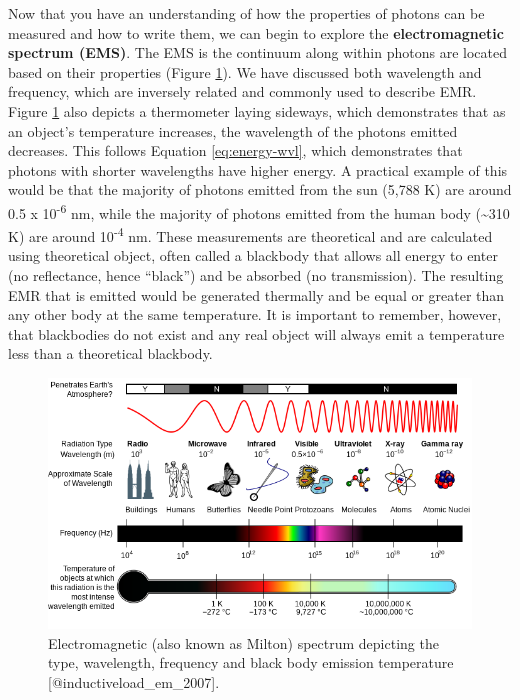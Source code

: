 \documentclass[
]{book}
\begin{document}
Now that you have an understanding of how the properties of photons can
be measured and how to write them, we can begin to explore the
\textbf{electromagnetic spectrum (EMS)}. The EMS is the continuum along
within photons are located based on their properties (Figure
\ref{fig:11-EMS}). We have discussed both wavelength and frequency,
which are inversely related and commonly used to describe EMR. Figure
\ref{fig:11-EMS} also depicts a thermometer laying sideways, which
demonstrates that as an object's temperature increases, the wavelength
of the photons emitted decreases. This follows Equation
\eqref{eq:energy-wvl}, which demonstrates that photons with shorter
wavelengths have higher energy. A practical example of this would be
that the majority of photons emitted from the sun (5,788 K) are around
0.5 x 10\textsuperscript{-6} nm, while the majority of photons emitted from the human
body (\textasciitilde310 K) are around 10\textsuperscript{-4} nm. These measurements are theoretical
and are calculated using theoretical object, often called a blackbody
that allows all energy to enter (no reflectance, hence ``black'') and
be absorbed (no transmission). The resulting EMR that is emitted would
be generated thermally and be equal or greater than any other body at
the same temperature. It is important to remember, however, that
blackbodies do not exist and any real object will always emit a
temperature less than a theoretical blackbody.

\begin{figure}
\includegraphics[width=2\linewidth]{images/11-EMS} \caption{Electromagnetic (also known as Milton) spectrum depicting the type, wavelength, frequency and black body emission temperature [@inductiveload_em_2007].}\label{fig:11-EMS}
\end{figure}
\end{document}
